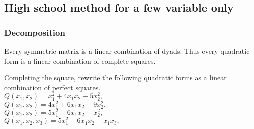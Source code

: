 \subsection{High school method for a few variable only}
\begin{frame}
    \frametitle{Decomposition}
    \begin{theorem}
        Every symmetric matrix is a linear combination of dyads. Thus
        every quadratic form is a linear combination of complete squares.
    \end{theorem}
\begin{example}
    Completing the square, rewrite the following quadratic forms as a linear combination of perfect squares.\\
    $Q\left( x_1,x_2 \right)=x_1^2+4x_1x_2-5x_2^2,$\\
    $Q\left( x_1,x_2 \right)=4x_1^2+6x_1x_2+9x_2^2,$\\
    $Q\left( x_1,x_2 \right)=5x_1^2-6x_1x_2+x_2^2,$\\
    $Q\left( x_1,x_2,x_3 \right)=5x_1^2-6x_1x_2+x_1x_3,$\\
\end{example}
\end{frame}
